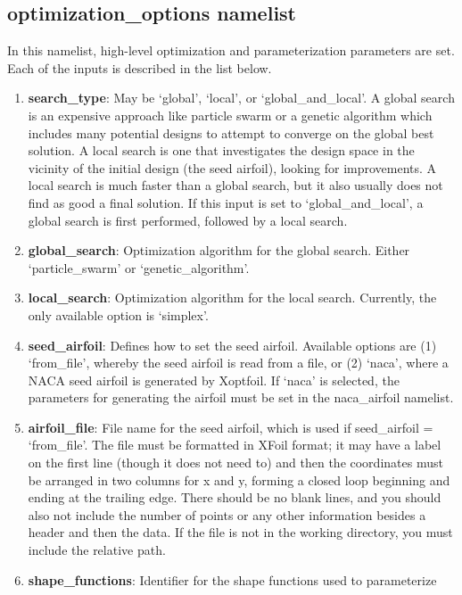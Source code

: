 \documentclass[11pt]{article}
\begin{document}
\subsection{optimization\_options namelist}

In this namelist, high-level optimization and parameterization parameters are set.  Each
of the inputs is described in the list below.

\begin{enumerate}
\item{\textbf{search\_type}: May be `global', `local', or `global\_and\_local'.
A global search is an expensive approach like particle swarm or a genetic algorithm which
includes many potential designs to attempt to converge on the global best solution.  A
local search is one that investigates the design space in the vicinity of the initial
design (the seed airfoil), looking for improvements.  A local search is much faster than
a global search, but it also usually does not find as good a final solution.  If this
input is set to `global\_and\_local', a global search is first performed, followed by a
local search.}
\item{\textbf{global\_search}: Optimization algorithm for the global search.  Either
`particle\_swarm' or `genetic\_algorithm'.}
\item{\textbf{local\_search}: Optimization algorithm for the local search.  Currently, the
only available option is `simplex'.}
\item{\textbf{seed\_airfoil}: Defines how to set the seed airfoil.  Available options are
(1) `from\_file', whereby the seed airfoil is read from a file, or (2) `naca', where a
NACA seed airfoil is generated by Xoptfoil. If `naca' is selected, the parameters for
generating the airfoil must be set in the naca\_airfoil namelist.}
\item{\textbf{airfoil\_file}: File name for the seed airfoil, which is used if
seed\_airfoil = `from\_file'.  The file must be formatted in XFoil format; it may have a
label on the first line (though it does not need to) and then the coordinates must be
arranged in two columns for x and y, forming a closed loop beginning and ending at the
trailing edge. There should be no blank lines, and you should also not include the number
of points or any other information besides a header and then the data.  If the file is not 
in the working directory, you must include the relative path.}
\item{\textbf{shape\_functions}: Identifier for the shape functions used to parameterize
}
\end{enumerate}
\end{document}

